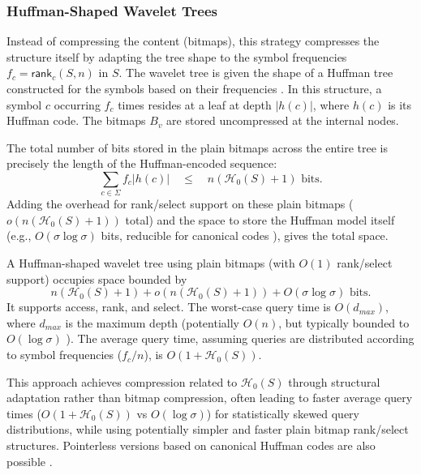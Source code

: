 \subsubsection{Huffman-Shaped Wavelet Trees} \label{subsec:huffman_shaped_wavelet_trees}

Instead of compressing the content (bitmaps), this strategy compresses the structure itself by adapting the tree shape to the symbol frequencies $f_c = \textsf{rank}_c(S, n)$ in $S$. The wavelet tree is given the shape of a Huffman tree \cite{huffman1952method} constructed for the symbols based on their frequencies \cite{grossi2004indexing, makinen2004new}. In this structure, a symbol $c$ occurring $f_c$ times resides at a leaf at depth $|h(c)|$, where $h(c)$ is its Huffman code. The bitmaps $B_v$ are stored uncompressed at the internal nodes.

The total number of bits stored in the plain bitmaps across the entire tree is precisely the length of the Huffman-encoded sequence:
\[ \sum_{c \in \Sigma} f_c |h(c)| \quad \le \quad n(\mathcal{H}_0(S)+1) \text{ bits}. \]
Adding the overhead for rank/select support on these plain bitmaps ($o(n(\mathcal{H}_0(S)+1))$ total) and the space to store the Huffman model itself (e.g., $O(\sigma \log \sigma)$ bits, reducible for canonical codes \cite{claude2015wavelet}), gives the total space.

\begin{theorem} \label{thm:huffman_wt_space_time}
    A Huffman-shaped wavelet tree using plain bitmaps (with $O(1)$ rank/select support) occupies space bounded by
    \[ n(\mathcal{H}_0(S)+1) + o(n(\mathcal{H}_0(S)+1)) + O(\sigma \log \sigma) \text{ bits}. \]
    It supports \textsf{access}, \textsf{rank}, and \textsf{select}. The worst-case query time is $O(d_{max})$, where $d_{max}$ is the maximum depth (potentially $O(n)$, but typically bounded to $O(\log \sigma)$ \cite{navarro2007compressed}). The average query time, assuming queries are distributed according to symbol frequencies ($f_c/n$), is $O(1+\mathcal{H}_0(S))$.
\end{theorem}

This approach achieves compression related to $\mathcal{H}_0(S)$ through structural adaptation rather than bitmap compression, often leading to faster average query times ($O(1+\mathcal{H}_0(S))$ vs $O(\log \sigma)$) for statistically skewed query distributions, while using potentially simpler and faster plain bitmap rank/select structures. Pointerless versions based on canonical Huffman codes are also possible \cite{claude2015wavelet}.

